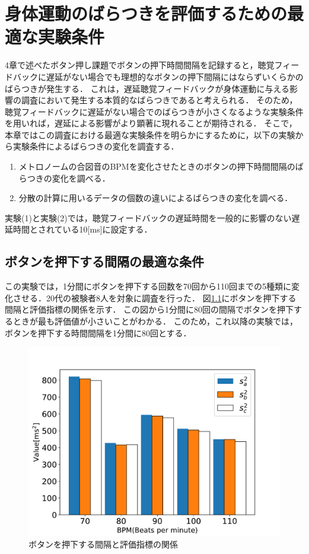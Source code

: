 \chapter{身体運動のばらつきを評価するための最適な実験条件}
4章で述べたボタン押し課題でボタンの押下時間間隔を記録すると，聴覚フィードバックに遅延がない場合でも理想的なボタンの押下間隔にはならずいくらかのばらつきが発生する．
これは，遅延聴覚フィードバックが身体運動に与える影響の調査において発生する本質的なばらつきであると考えられる．
そのため，聴覚フィードバックに遅延がない場合でのばらつきが小さくなるような実験条件を用いれば，遅延による影響がより顕著に現れることが期待される．
そこで，本章ではこの調査における最適な実験条件を明らかにするために，以下の実験から実験条件によるばらつきの変化を調査する．
\begin{enumerate}[leftmargin=*, label=実験(\arabic*)] %
  \item メトロノームの合図音のBPMを変化させたときのボタンの押下時間間隔のばらつきの変化を調べる．
  \item 分散の計算に用いるデータの個数の違いによるばらつきの変化を調べる．
\end{enumerate}
実験(1)と実験(2)では，聴覚フィードバックの遅延時間を一般的に影響のない遅延時間とされている10[ms]に設定する．
\section{ボタンを押下する間隔の最適な条件}
この実験では，1分間にボタンを押下する回数を70回から110回までの5種類に変化させる．20代の被験者8人を対象に調査を行った．
図\ref{fig:bpm}にボタンを押下する間隔と評価指標の関係を示す．
この図から1分間に80回の間隔でボタンを押下するときが最も評価値が小さいことがわかる．
このため，これ以降の実験では，ボタンを押下する時間間隔を1分間に80回とする．
\begin{figure}[b]
  \centering
  \includegraphics[scale=0.6]{figures/Yobi/Var/BPM-Change-Var.pdf}
  \caption{ボタンを押下する間隔と評価指標の関係}
  \label{fig:bpm}
\end{figure}
